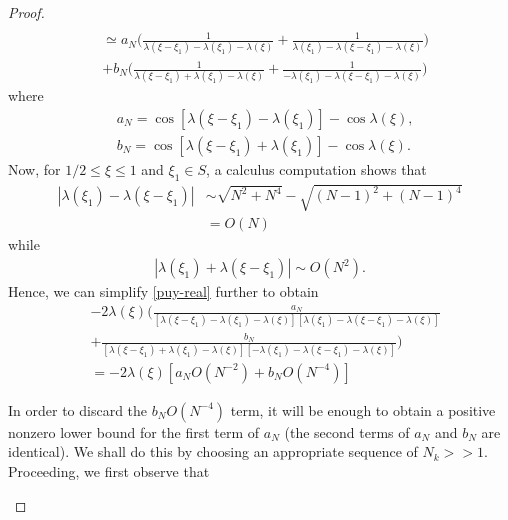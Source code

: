 \documentclass[12pt,reqno]{amsart}
\numberwithin{equation}{section}  %
\begin{document}
\begin{proof}
\begin{equation}
\begin{split}
  \\
  & \simeq a_{N} \bigg ( \frac{1}{\lambda(\xi - \xi_{1}) - \lambda(\xi_{1}) - \lambda(\xi)} + \frac{1}{\lambda(\xi_{1}) - \lambda(\xi - \xi_{1}) - \lambda(\xi)} \bigg )
  \\
  & + b_{N} \bigg ( \frac{1}{\lambda(\xi - \xi_{1}) + \lambda(\xi_{1}) - \lambda(\xi)} + \frac{1}{-\lambda(\xi_{1}) - \lambda(\xi - \xi_{1}) - \lambda(\xi)} 
  \bigg ) 
\end{split}
\end{equation}
where
%
%
\begin{equation*}
\begin{split}
  & a_{N} =   \cos[\lambda(\xi - \xi_{1}) - \lambda(\xi_{1})] - \cos \lambda(\xi),
  \\
  & b_{N} =  \cos[\lambda(\xi - \xi_{1}) + \lambda(\xi_{1})] - \cos \lambda(\xi).
\end{split}
\end{equation*}
Now, for $1/2 \le \xi \le 1$ and $\xi_{1} \in S$, a calculus computation shows that
%
%
\begin{equation*}
\begin{split}
|\lambda(\xi_{1}) - \lambda(\xi - \xi_{1})|
 & \sim \sqrt{N^{2} + N^{4}} - \sqrt{(N-1)^{2} + (N-1)^{4}} 
 \\
 & = O(N)
\end{split}
\end{equation*}
%
%
while
%
%
\begin{equation*}
\begin{split}
  |\lambda(\xi_{1}) + \lambda(\xi - \xi_{1})| \sim O(N^{2}).
\end{split}
\end{equation*}
Hence, we can simplify \eqref{puy-real} further to obtain
%
%
\begin{equation}
  \label{pre-cont-an}
\begin{split}
  & -2 \lambda(\xi) \bigg (  \frac{a_{N}}{[\lambda(\xi - \xi_{1}) - \lambda(\xi_{1}) - \lambda(\xi)][\lambda(\xi_{1}) - \lambda(\xi - \xi_{1}) - \lambda(\xi)]} 
  \\
  & +  \frac{b_{N}}{[\lambda(\xi - \xi_{1}) + \lambda(\xi_{1}) - \lambda(\xi)][-\lambda(\xi_{1}) - \lambda(\xi - \xi_{1}) - \lambda(\xi)]} 
   \bigg )
   \\
   & = -2 \lambda(\xi) \left [ a_{N} O(N^{-2}) + b_{N} O(N^{-4})  \right ]
\end{split}
\end{equation}
\begin{framed}
In order to discard the $b_{N}O(N^{-4})$ term, it will be enough to obtain 
a positive nonzero lower bound for the first term of $a_{N}$ (the second terms of $a_{N}$ and $b_{N}$ are identical). We shall do this by choosing an appropriate sequence of $N_{k} >>1$. Proceeding, we first observe that
%


\end{framed}
\end{proof}
\end{document}
